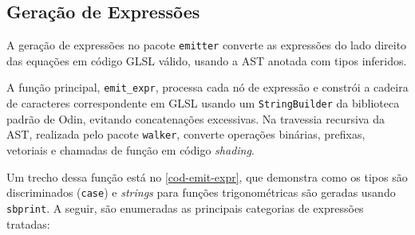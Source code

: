 

\subsection{Geração de Expressões} \label{sec-RHS}

A geração de expressões no pacote \texttt{emitter} converte as expressões do lado direito das equações em código GLSL válido, usando a AST anotada com tipos inferidos.

A função principal, \verb"emit_expr", processa cada nó de expressão e constrói a cadeira de caracteres correspondente em GLSL usando um \verb"StringBuilder" da biblioteca padrão de Odin, evitando concatenações excessivas. Na travessia recursiva da AST, realizada pelo pacote \texttt{walker}, converte operações binárias, prefixas, vetoriais e chamadas de função em código \textit{shading}.

Um trecho dessa função está no \autoref{cod-emit-expr}, que demonstra como os tipos são discriminados (\texttt{case}) e \textit{strings} para funções trigonométricas são geradas usando \verb|sbprint|. A seguir, são enumeradas as principais categorias de expressões tratadas:

